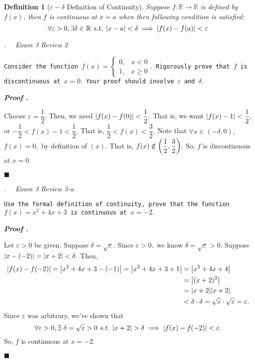 \documentclass[11pt,letter]{article}
\newcounter{nq}[section]
\newcounter{np}[section]
\newtheorem{df}{Definition}[section]
\newenvironment*{p}{\par\noindent\textbf{\textit{Proof \stepcounter{np}\thenp. }}\par}{\par\hfill $\blacksquare$\par}
\newenvironment*{q}[1]{\noindent\emph{\thesection.\stepcounter{nq}\thenq$\quad $ #1}\par\noindent\texttt}{}
\def\R{{\mathbb{R}}}
\def\epsilon{\varepsilon}
\def\st{\emph{ s.t. }}
\begin{document}
\begin{df}[$\epsilon-\delta$ Definition of Continuity]
	Suppose $f:\R\to\R$ is defined by $f(x)$, then $f$ is continuous at $x=a$ when then following condition is satisfied: \[\forall\epsilon>0,\exists\delta\in\R\st\qty|x-a|<\delta\implies\qty|f(x)-f(a)|<\epsilon\]
\end{df}

\begin{framed}\begin{q}
	{Exam 3 Review 2}
	{Consider the function $f(x)=\begin{cases}0,&x<0\\1,&x\geq0\end{cases}.$ Rigorously prove that $f$ is discontinuous at $x=0.$ Your proof should involve $\epsilon$ and $\delta.$}
\end{q}\end{framed}
\begin{p}
	Choose $\epsilon=\dfrac{1}{2}$.	Then, we need $\qty|f(x)-f(0)|<\dfrac{1}{2}.$ That is, we want $\qty|f(x)-1|<\dfrac{1}{2},$ or $-\dfrac{1}{2}<f(x)-1<\dfrac{1}{2}.$ That is, $\dfrac{1}{2}<f(x)<\dfrac{3}{2}.$ Note that $\forall x\in(-\delta,0),$ $f(x)=0,$ by definition of $(x).$ That is, $f(x)\notin\qty(\dfrac{1}{2},\dfrac{3}{2}).$ So, $f$ is discontinuous at $x=0.$
\end{p}

\begin{framed}\begin{q}
	{Exam 3 Review 3-a}
	{Use the formal definition of continuity, prove that the function $f(x)=x^2+4x+3$ is continuous at $x=-2.$}
\end{q}\end{framed}
\begin{p}
	Let $\epsilon>0$ be given. Suppose $\delta=\sqrt{\epsilon}.$ Since $\epsilon>0,$ we know $\delta=\sqrt{\epsilon}>0.$ Suppose $\qty|x-(-2)|=\qty|x+2|<\delta.$ Then, \[\begin{aligned}\qty|f(x)-f(-2)|=\qty|x^2+4x+3-(-1)|=\qty|x^2+4x+3+1|&=\qty|x^2+4x+4|\\&=\qty|(x+2)^2|\\&=\qty|x+2|\qty|x+2|\\&<\delta\cdot\delta=\sqrt{\epsilon}\cdot\sqrt{\epsilon}=\epsilon.\end{aligned}\] Since $\epsilon$ was arbitrary, we've shown that \[\forall\epsilon>0,\exists\ \delta=\sqrt{\epsilon}>0\st\qty|x+2|>\delta\implies\qty|f(x)-f(-2)|<\epsilon.\] So, $f$ is continuous at $x=-2.$
\end{p}
\end{document}
